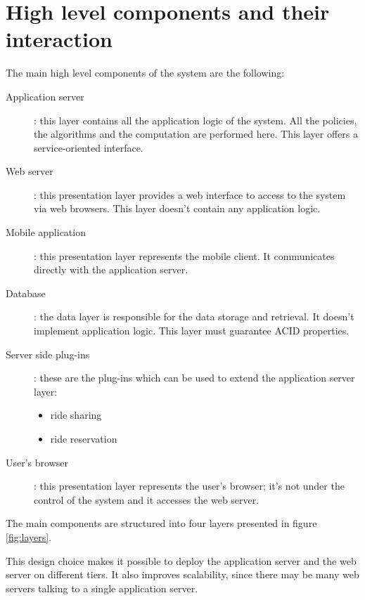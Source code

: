 \section{High level components and their interaction}
\label{sec:high-level}

The main high level components of the system are the following:
\begin{description}
	\item[Application server]: this layer contains all the application logic of the system. All the policies, the algorithms and the computation are performed here. This layer offers a service-oriented interface.
	\item[Web server]: this presentation layer provides a web interface to access to the system via web browsers. This layer doesn't contain any application logic.
	\item[Mobile application]: this presentation layer represents the mobile client. It communicates directly with the application server.
	\item[Database]: the data layer is responsible for the data storage and retrieval. It doesn't implement application logic. This layer must guarantee ACID properties.
	\item[Server side plug-ins]: these are the plug-ins which can be used to extend the application server layer:
		\begin{itemize}
		\item ride sharing
		\item ride reservation
		\end{itemize}
	\item[User's browser]: this presentation layer represents the user's browser; it's not under the control of the system and it accesses the web server.
\end{description}

The main components are structured into four layers presented in figure \ref{fig:layers}.

This design choice makes it possible to deploy the application server and the web server on different tiers. It also improves scalability, since there may be many web servers talking to a single application server.


